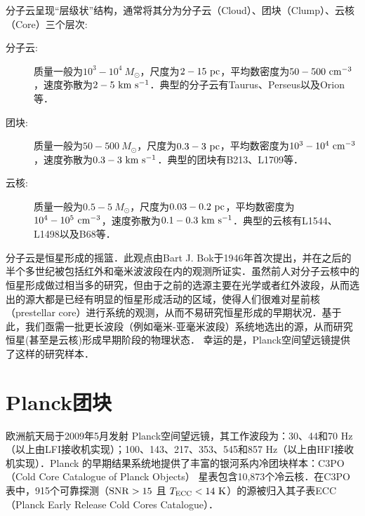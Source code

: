 \documentclass[UTF8, nocolorlinks]{pkuthss}
\begin{document}
		分子云呈现“层级状”结构\supercite{1994ApJ...423..681V}，通常将其分为分子云（Cloud）、团块（Clump）、云核（Core）三个层次\supercite{2007ARA&A..45..339B,2000prpl.conf...97W}:
		\begin{description}
			\item[分子云:] 质量一般为$10^3-10^4\ M_{\odot}$，尺度为$2-15\rm\ pc$，平均数密度为$50-500\rm\ cm^{-3}$，速度弥散为$2- 5\rm\ km\ s^{-1}$\supercite{2007ARA&A..45..339B}．典型的分子云有Taurus、Perseus以及Orion等．

			\item[团块:] 质量一般为$50-500\ M_{\odot}$，尺度为$0.3-3\rm\ pc$，平均数密度为$10^3-10^4\rm\ cm^{-3}$，速度弥散为$0.3- 3\rm\ km\ s^{-1}$\supercite{2007ARA&A..45..339B}．典型的团块有B213、L1709等\supercite{2007ARA&A..45..339B}．

			\item[云核:] 质量一般为$0.5-5\ M_{\odot}$，尺度为$0.03-0.2\rm\ pc$，平均数密度为$10^4-10^5\rm\ cm^{-3}$，速度弥散为$0.1- 0.3\rm\ km\ s^{-1}$\supercite{2007ARA&A..45..339B}．典型的云核有L1544、L1498以及B68等\supercite{2007ARA&A..45..339B}．
		\end{description}

		分子云是恒星形成的摇篮．此观点由Bart J. Bok于1946年首次提出\supercite{1948HarMo...7...53B}，并在之后的半个多世纪被包括红外和毫米波波段在内的观测所证实\supercite{shu1987star,2007ARA&A..45..339B}．虽然前人对分子云核中的恒星形成做过相当多的研究，但由于之前的选源主要在光学或者红外波段，从而选出的源大都是已经有明显的恒星形成活动的区域，使得人们很难对星前核（prestellar core）进行系统的观测，从而不易研究恒星形成的早期状况．基于此，我们亟需一批更长波段（例如毫米-亚毫米波段）系统地选出的源，从而研究恒星(甚至是云核)形成早期阶段的物理状态． 幸运的是，Planck空间望远镜提供了这样的研究样本．

	\section{Planck团块}

		欧洲航天局于2009年5月发射 Planck空间望远镜，其工作波段为：30、44和70 Hz（以上由LFI接收机实现）；100、143、217、353、545和857 Hz（以上由HFI接收机实现）\supercite{2011A&A...536A...1P}．Planck 的早期结果系统地提供了丰富的银河系内冷团块样本：C3PO（Cold Core Catalogue of Planck Objects） 星表包含10,873个冷云核\supercite{2011yCat.8088....0P,2011A&A...536A..23P}．在C3PO表中，915个可靠探测（$\rm SNR>15$ 且 $T_{\rm ECC}<14\rm\ K$）的源被归入其子表ECC（Planck Early Release Cold Cores Catalogue）\supercite{2011yCat.8088....0P,2011A&A...536A..23P}．
\end{document}
